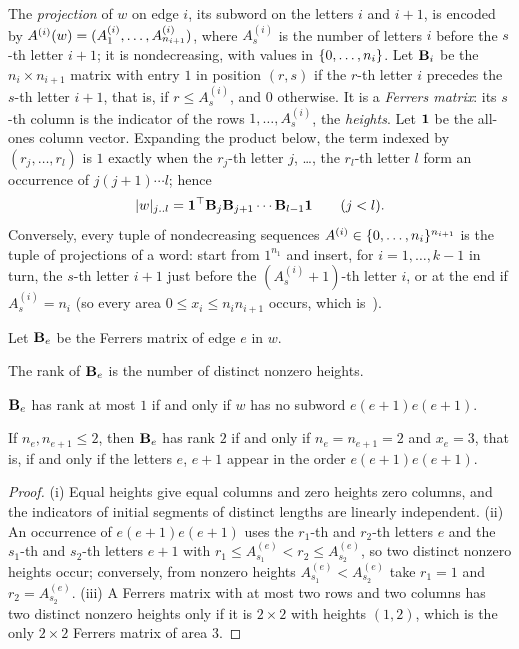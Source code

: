 \documentclass[11pt,a4paper]{article}
\begin{document}
The \emph{projection} of $w$ on edge $i$, its subword on the letters $i$ and $i+1$, is encoded by $A^{(i)}(w)=(A^{(i)}_1,\dots,A^{(i)}_{n_{i+1}})$, where $A^{(i)}_s$ is the number of letters $i$ before the $s$-th letter $i+1$; it is nondecreasing, with values in $\{0,\ldots,n_i\}$. Let $\mathbf{B}_{i}$ be the $n_i\times n_{i+1}$ matrix with entry $1$ in position $(r,s)$ if the $r$-th letter $i$ precedes the $s$-th letter $i+1$, that is, if $r\le A^{(i)}_s$, and $0$ otherwise. It is a \emph{Ferrers matrix}: its $s$-th column is the indicator of the rows $1,\dots,A^{(i)}_s$, the \emph{heights}. Let $\mathbf{1}$ be the all-ones column vector. Expanding the product below, the term indexed by $(r_j,\dots,r_l)$ is $1$ exactly when the $r_j$-th letter $j$, \dots, the $r_l$-th letter $l$ form an occurrence of $j(j+1)\cdots l$; hence
\begin{equation}\label{eq:product}
\lvert w\rvert_{j\mathinner{\ldotp\ldotp} l}=\mathbf{1}^{\top}\mathbf{B}_{j}\mathbf{B}_{j+1}\cdots\mathbf{B}_{l-1}\mathbf{1}\qquad(j<l).
\end{equation}
Conversely, every tuple of nondecreasing sequences $A^{(i)}\in\{0,\ldots,n_i\}^{n_{i+1}}$ is the tuple of projections of a word: start from $1^{n_1}$ and insert, for $i=1,\dots,k-1$ in turn, the $s$-th letter $i+1$ just before the $(A^{(i)}_s+1)$-th letter $i$, or at the end if $A^{(i)}_s=n_i$ (so every area $0\le x_i\le n_in_{i+1}$ occurs, which is~\cite[Lemma~8, p.~19]{MSY04}).

\begin{lemma}\label{lem:rank}
Let $\mathbf{B}_{e}$ be the Ferrers matrix of edge $e$ in $w$.
\begin{parts}
\item The rank of $\mathbf{B}_{e}$ is the number of distinct nonzero heights.
\item $\mathbf{B}_{e}$ has rank at most $1$ if and only if $w$ has no subword $e(e+1)e(e+1)$.
\item If $n_e,n_{e+1}\le2$, then $\mathbf{B}_{e}$ has rank $2$ if and only if $n_e=n_{e+1}=2$ and $x_e=3$, that is, if and only if the letters $e$, $e+1$ appear in the order $e(e+1)e(e+1)$.
\end{parts}
\end{lemma}

\begin{proof}
(i) Equal heights give equal columns and zero heights zero columns, and the indicators of initial segments of distinct lengths are linearly independent. (ii) An occurrence of $e(e+1)e(e+1)$ uses the $r_1$-th and $r_2$-th letters $e$ and the $s_1$-th and $s_2$-th letters $e+1$ with $r_1\le A^{(e)}_{s_1}<r_2\le A^{(e)}_{s_2}$, so two distinct nonzero heights occur; conversely, from nonzero heights $A^{(e)}_{s_1}<A^{(e)}_{s_2}$ take $r_1=1$ and $r_2=A^{(e)}_{s_2}$. (iii) A Ferrers matrix with at most two rows and two columns has two distinct nonzero heights only if it is $2\times2$ with heights $(1,2)$, which is the only $2\times2$ Ferrers matrix of area $3$.
\end{proof}
\end{document}
